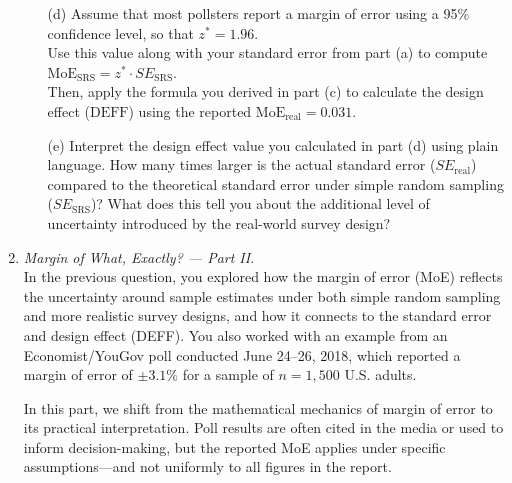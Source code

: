 \documentclass{article}
\begin{document}
\begin{enumerate}
\begin{enumerate}
        \item[(d)] Assume that most pollsters report a margin of error using a 95\% confidence level, so that \( z^* = 1.96 \). \\
        Use this value along with your standard error from part (a) to compute \( \text{MoE}_{\text{SRS}} = z^* \cdot SE_{\text{SRS}} \). \\
        Then, apply the formula you derived in part (c) to calculate the design effect (\( \text{DEFF} \)) using the reported \( \text{MoE}_{\text{real}} = 0.031 \).

        \item[(e)] Interpret the design effect value you calculated in part (d) using plain language. How many times larger is the actual standard error ($SE_{\text{real}}$) compared to the theoretical standard error under simple random sampling ($SE_{\text{SRS}}$)? What does this tell you about the additional level of uncertainty introduced by the real-world survey design?

    \end{enumerate}

\item  \emph{Margin of What, Exactly? — Part II}. \\
    In the previous question, you explored how the margin of error (MoE) reflects the uncertainty around sample estimates under both simple random sampling and more realistic survey designs, and how it connects to the standard error and design effect (DEFF). You also worked with an example from an Economist/YouGov poll conducted June 24–26, 2018, which reported a margin of error of $\pm 3.1\%$ for a sample of $n = 1{,}500$ U.S. adults.

    In this part, we shift from the mathematical mechanics of margin of error to its practical interpretation. Poll results are often cited in the media or used to inform decision-making, but the reported MoE applies under specific assumptions—and not uniformly to all figures in the report.


\end{enumerate}
\end{document}

